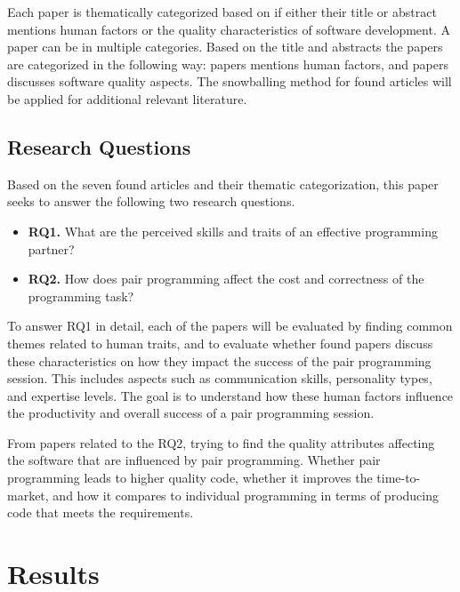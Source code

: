 \documentclass[conference]{IEEEtran}
\begin{document}
Each paper is thematically categorized based on if either their title or abstract mentions human factors or the quality characteristics of software development. A paper can be in multiple categories. Based on the title and abstracts the papers are categorized in the following way: papers \cite{10.1145/2652524.2652529, Williams2000Strengthening, 10.1145/1414004.1414026, Arisholm2007Evaluating, 10.1145/1852786.1852816, Hannay2009effectiveness} mentions human factors, and papers \cite{Williams2000Strengthening, 10.1145/1414004.1414026, Arisholm2007Evaluating, 10.1145/1159733.1159749, Hannay2009effectiveness} discusses software quality aspects. The snowballing method for found articles will be applied for additional relevant literature.

\subsection{Research Questions}

Based on the seven found articles and their thematic categorization, this paper seeks to answer the following two research questions.

\begin{itemize}
    \item \textbf{RQ1.} What are the perceived skills and traits of an effective programming partner?
    \item \textbf{RQ2.} How does pair programming affect the cost and correctness of the programming task?
\end{itemize}

To answer RQ1 in detail, each of the papers will be evaluated by finding common themes related to human traits, and to evaluate whether found papers discuss these characteristics on how they impact the success of the pair programming session. This includes aspects such as communication skills, personality types, and expertise levels. The goal is to understand how these human factors influence the productivity and overall success of a pair programming session.

From papers related to the RQ2, trying to find the quality attributes affecting the software that are influenced by pair programming. Whether pair programming leads to higher quality code, whether it improves the time-to-market, and how it compares to individual programming in terms of producing code that meets the requirements. 

\section{Results}
\end{document}
